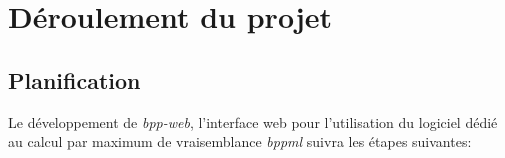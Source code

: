 
%

\section{Déroulement du projet} 

\subsection{Planification}

Le développement de \textit{bpp-web}, l'interface web pour l'utilisation du
logiciel dédié au calcul par maximum de vraisemblance \textit{bppml} suivra les
 étapes suivantes:

